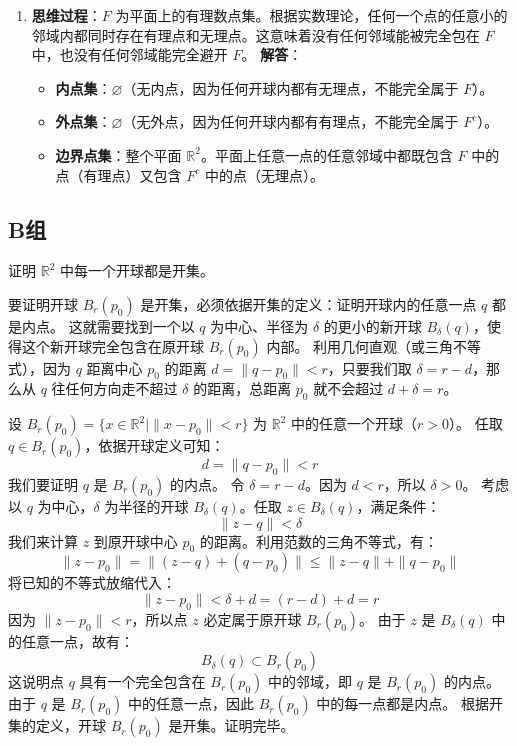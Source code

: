 \documentclass[lang=cn,11pt]{elegantbook}
\begin{document}
\begin{solution}
\begin{enumerate}
  \item[(4)] \textbf{思维过程}：$F$ 为平面上的有理数点集。根据实数理论，任何一个点的任意小的邻域内都同时存在有理点和无理点。这意味着没有任何邻域能被完全包在 $F$ 中，也没有任何邻域能完全避开 $F$。
  \textbf{解答}：
  \begin{itemize}
    \item \textbf{内点集}：$\varnothing$（无内点，因为任何开球内都有无理点，不能完全属于 $F$）。
    \item \textbf{外点集}：$\varnothing$（无外点，因为任何开球内都有有理点，不能完全属于 $F^c$）。
    \item \textbf{边界点集}：整个平面 $\mathbb{R}^2$。平面上任意一点的任意邻域中都既包含 $F$ 中的点（有理点）又包含 $F^c$ 中的点（无理点）。
  \end{itemize}
\end{enumerate}
\end{solution}

\subsection{B组}

\begin{exercise}[开集性质的证明]
证明 $\mathbb{R}^2$ 中每一个开球都是开集。
\end{exercise}
\begin{note}
要证明开球 $B_r(p_0)$ 是开集，必须依据开集的定义：证明开球内的任意一点 $q$ 都是内点。
这就需要找到一个以 $q$ 为中心、半径为 $\delta$ 的更小的新开球 $B_\delta(q)$，使得这个新开球完全包含在原开球 $B_r(p_0)$ 内部。
利用几何直观（或三角不等式），因为 $q$ 距离中心 $p_0$ 的距离 $d = \|q - p_0\| < r$，只要我们取 $\delta = r - d$，那么从 $q$ 往任何方向走不超过 $\delta$ 的距离，总距离 $p_0$ 就不会超过 $d + \delta = r$。
\end{note}
\begin{solution}
设 $B_r(p_0) = \{x \in \mathbb{R}^2 \mid \|x - p_0\| < r\}$ 为 $\mathbb{R}^2$ 中的任意一个开球（$r > 0$）。
任取 $q \in B_r(p_0)$，依据开球定义可知：
\[
d = \|q - p_0\| < r
\]
我们要证明 $q$ 是 $B_r(p_0)$ 的内点。
令 $\delta = r - d$。因为 $d < r$，所以 $\delta > 0$。
考虑以 $q$ 为中心，$\delta$ 为半径的开球 $B_\delta(q)$。任取 $z \in B_\delta(q)$，满足条件：
\[
\|z - q\| < \delta
\]
我们来计算 $z$ 到原开球中心 $p_0$ 的距离。利用范数的三角不等式，有：
\[
\|z - p_0\| = \|(z - q) + (q - p_0)\| \leqslant  \|z - q\| + \|q - p_0\|
\]
将已知的不等式放缩代入：
\[
\|z - p_0\| < \delta + d = (r - d) + d = r
\]
因为 $\|z - p_0\| < r$，所以点 $z$ 必定属于原开球 $B_r(p_0)$。
由于 $z$ 是 $B_\delta(q)$ 中的任意一点，故有：
\[
B_\delta(q) \subset B_r(p_0)
\]
这说明点 $q$ 具有一个完全包含在 $B_r(p_0)$ 中的邻域，即 $q$ 是 $B_r(p_0)$ 的内点。
由于 $q$ 是 $B_r(p_0)$ 中的任意一点，因此 $B_r(p_0)$ 中的每一点都是内点。
根据开集的定义，开球 $B_r(p_0)$ 是开集。证明完毕。
\end{solution}
\end{document}
